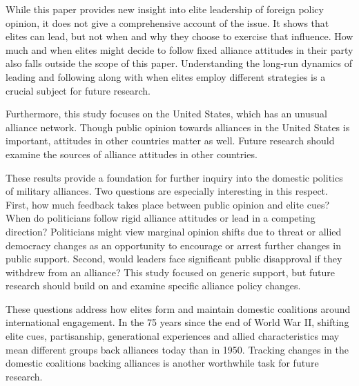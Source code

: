 \documentclass[12pt]{article}
\begin{document}
While this paper provides new insight into elite leadership of foreign policy opinion, it does not give a comprehensive account of the issue.
It shows that elites can lead, but not when and why they choose to exercise that influence. 
How much and when elites might decide to follow fixed alliance attitudes in their party also falls outside the scope of this paper. 
Understanding the long-run dynamics of leading and following along with when elites employ different strategies is a crucial subject for future research. 


Furthermore, this study focuses on the United States, which has an unusual alliance network. 
Though public opinion towards alliances in the United States is important, attitudes in other countries matter as well. 
Future research should examine the sources of alliance attitudes in other countries. 


These results provide a foundation for further inquiry into the domestic politics of military alliances. 
Two questions are especially interesting in this respect.
First, how much feedback takes place between public opinion and elite cues? 
When do politicians follow rigid alliance attitudes or lead in a competing direction? 
Politicians might view marginal opinion shifts due to threat or allied democracy changes as an opportunity to encourage or arrest further changes in public support.
Second, would leaders face significant public disapproval if they withdrew from an alliance? 
This study focused on generic support, but future research should build on \citet{TomzWeeks2021} and examine specific alliance policy changes. 


These questions address how elites form and maintain domestic coalitions around international engagement. 
In the 75 years since the end of World War II, shifting elite cues, partisanship, generational experiences and allied characteristics may mean different groups back alliances today than in 1950. 
Tracking changes in the domestic coalitions backing alliances is another worthwhile task for future research.





\newpage

 
 
\end{document}
